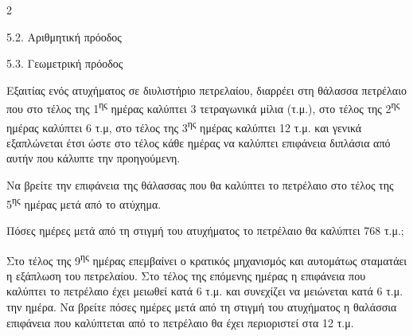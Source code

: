 \begin{ylh}{2}
    \item 5.2. Αριθμητική πρόοδος
    \item 5.3. Γεωμετρική πρόοδος
\end{ylh}
Εξαιτίας ενός ατυχήματος σε διυλιστήριο πετρελαίου, διαρρέει στη θάλασσα πετρέλαιο που στο τέλος της 1\textsuperscript{ης} ημέρας καλύπτει 3 τετραγωνικά μίλια (τ.μ.), στο τέλος της 2\textsuperscript{ης} ημέρας καλύπτει 6 τ.μ, στο τέλος της 3\textsuperscript{ης} ημέρας καλύπτει 12 τ.μ. και γενικά εξαπλώνεται έτσι ώστε στο τέλος κάθε ημέρας να καλύπτει επιφάνεια διπλάσια από αυτήν που κάλυπτε την προηγούμενη.

\begin{alist}
\item Να βρείτε την επιφάνεια της θάλασσας που θα καλύπτει το πετρέλαιο στο τέλος της 5\textsuperscript{ης} ημέρας μετά από το ατύχημα.
\item Πόσες ημέρες μετά από τη στιγμή του ατυχήματος το πετρέλαιο θα καλύπτει 768 τ.μ.;

\item Στο τέλος της 9\textsuperscript{ης} ημέρας επεμβαίνει ο κρατικός μηχανισμός και αυτομάτως σταματάει η εξάπλωση του πετρελαίου. Στο τέλος της επόμενης ημέρας η επιφάνεια που καλύπτει το πετρέλαιο έχει μειωθεί κατά 6 τ.μ. και συνεχίζει να μειώνεται κατά 6 τ.μ. την ημέρα. Να βρείτε πόσες ημέρες μετά από τη στιγμή του ατυχήματος η θαλάσσια επιφάνεια που καλύπτεται από το πετρέλαιο θα έχει περιοριστεί στα 12 τ.μ.

\end{alist}


